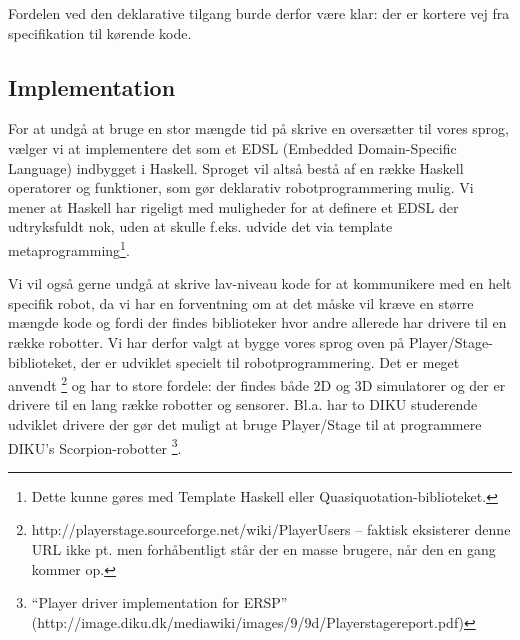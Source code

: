 \documentclass[a4paper,oneside, draft]{memoir}
\begin{document}
Fordelen ved den deklarative tilgang burde derfor være klar: der er kortere vej
fra specifikation til kørende kode.


\subsection{Implementation}
For at undgå at bruge en stor mængde tid på skrive en oversætter til vores
sprog, vælger vi at implementere det som et EDSL (Embedded Domain-Specific
Language) indbygget i Haskell. Sproget vil altså bestå af en række Haskell
operatorer og funktioner, som gør deklarativ robotprogrammering mulig. Vi mener
at Haskell har rigeligt med muligheder for at definere et EDSL der udtryksfuldt
nok, uden at skulle f.eks. udvide det via template
metaprogramming\footnote{Dette kunne gøres med Template Haskell eller
  Quasiquotation-biblioteket.}.

Vi vil også gerne undgå at skrive lav-niveau kode for at kommunikere med en helt
specifik robot, da vi har en forventning om at det måske vil kræve en større
mængde kode og fordi der findes biblioteker hvor andre allerede har drivere til
en række robotter. Vi har derfor valgt at bygge vores sprog oven på
Player/Stage-biblioteket, der er udviklet specielt til robotprogrammering. Det
er meget anvendt \footnote{http://playerstage.sourceforge.net/wiki/PlayerUsers
  -- faktisk eksisterer denne URL ikke pt. men forhåbentligt står der en masse
  brugere, når den en gang kommer op.} og har to store fordele: der findes både
2D og 3D simulatorer og der er drivere til en lang række robotter og
sensorer. Bl.a. har to DIKU studerende udviklet drivere der gør det muligt at
bruge Player/Stage til at programmere DIKU's Scorpion-robotter
\footnote{"`Player driver implementation for ERSP"'
  (http://image.diku.dk/mediawiki/images/9/9d/Playerstagereport.pdf)}.
\end{document}
